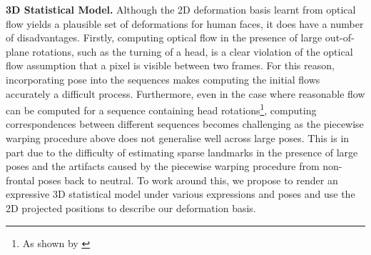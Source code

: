 \textbf{3D Statistical Model.}
Although the 2D deformation basis learnt from optical flow yields a plausible
set of deformations for human faces, it does have a number of disadvantages.
Firstly, computing optical flow in the presence of large out-of-plane rotations,
such as the turning of a head, is a clear violation of the optical flow assumption
that a pixel is visible between two frames. For this reason, incorporating pose into the
sequences makes computing the initial flows accurately a difficult process.
Furthermore, even in the case where reasonable flow can be computed for a 
sequence containing head rotations\footnote{As shown by \citet{garg2013dense}},
computing correspondences between different sequences becomes challenging
as the piecewise warping procedure above does not generalise well across large
poses. This is in part due to the difficulty of estimating sparse landmarks
in the presence of large poses and the artifacts caused by the piecewise warping
procedure from non-frontal poses back to neutral.
To work around this, we propose to render an expressive 3D statistical model
under various expressions and poses and use the 2D projected positions
to describe our deformation basis. 

